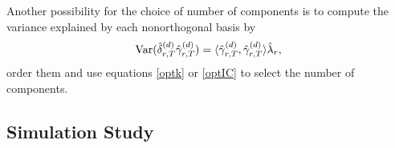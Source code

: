 Another possibility for the choice of number of components is to compute the variance explained by each nonorthogonal basis by 
\begin{equation}\label{varnno}
\operatorname{Var}(\hat{\delta}_{r,T}^{(d)}\hat{\gamma}_{r,T}^{(d)})=\langle \hat{\gamma}_{r,T}^{(d)},\hat{\gamma}_{r,T}^{(d)}\rangle\hat{\lambda}_r,
\end{equation}
order them and use equations \eqref{optk} or \eqref{optIC} to select the number of components.



\subsection{Simulation Study}\label{simstudy}


